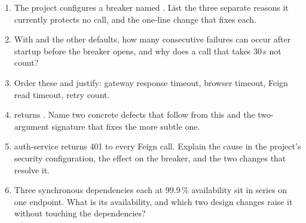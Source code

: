 \begin{quiz}
\begin{enumerate}
  \item The project configures a breaker named .
  List the three separate reasons it currently protects no call, and
  the one-line change that fixes each.
  \item With  and the other defaults,
  how many consecutive failures can occur after startup before the
  breaker opens, and why does a call that takes 30\,s not count?
  \item Order these and justify: gateway response timeout, browser
  timeout, Feign read timeout, retry count.
  \item {} returns . Name
  two concrete defects that follow from this and the two-argument
  signature that fixes the more subtle one.
  \item auth-service returns 401 to every Feign call. Explain the cause
  in the project's security configuration, the effect on the breaker,
  and the two changes that resolve it.
  \item Three synchronous dependencies each at 99.9\,\% availability
  sit in series on one endpoint. What is its availability, and which
  two design changes raise it without touching the dependencies?
\end{enumerate}
\end{quiz}
